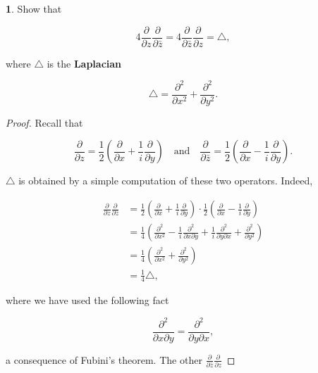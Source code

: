 \documentclass[12pt,a4]{article}
\theoremstyle{definition}
\newtheorem{exercise}{}
\begin{document}
	\begin{exercise}\label{ex:10}
		Show that
	
		\[
		4 \frac{\partial}{\partial z} \frac{\partial}{\partial \bar{z}} = 4 \frac{\partial}{\partial \bar{z}} \frac{\partial}{\partial z} = \triangle {,}
		\]
	
		\noindent where $\triangle$ is the \textbf{Laplacian}
	
		\[
		\triangle = \frac{\partial^2}{\partial x^2} + \frac{\partial^2}{\partial y^2} {.}
		\]
	\end{exercise}
	\begin{proof}
		Recall that 
		
		\[
		\frac{\partial}{\partial z} = \frac{1}{2} \left( \frac{\partial}{\partial x} + \frac{1}{i} \frac{\partial}{\partial y} \right) \quad \text{and} \quad \frac{\partial}{\partial \bar{z}} = \frac{1}{2} \left( \frac{\partial}{\partial x} - \frac{1}{i} \frac{\partial}{\partial y} \right) {.}
		\]
		
		\noindent $\triangle$ is obtained by a simple computation of these two operators. Indeed, 
		
		\begin{align*}
		\frac{\partial}{\partial z} \frac{\partial}{\partial \bar{z}} &= \frac{1}{2} \left( \frac{\partial}{\partial x} + \frac{1}{i} \frac{\partial}{\partial y} \right) \cdot \frac{1}{2} \left( \frac{\partial}{\partial x} - \frac{1}{i} \frac{\partial}{\partial y} \right) \\
		 &= \frac{1}{4} \left( \frac{\partial^2}{\partial x^2} - \frac{1}{i} \frac{\partial^2}{\partial x \partial y} + \frac{1}{i} \frac{\partial^2}{\partial y \partial x} + \frac{\partial^2}{\partial y^2} \right) \\
		 &= \frac{1}{4} \left( \frac{\partial^2}{\partial x^2} + \frac{\partial^2}{\partial y^2} \right) \\
		 &= \frac{1}{4} \triangle {,} 
		\end{align*}
		
		\noindent where we have used the following fact
		
		\[
		\frac{\partial^2}{\partial x \partial y} = \frac{\partial^2}{\partial y \partial x} {,}
		\]
		
		\noindent a consequence of Fubini's theorem. The other $\frac{\partial}{\partial \bar{z}} \frac{\partial}{\partial z}$
		

	\end{proof}
\end{document}
